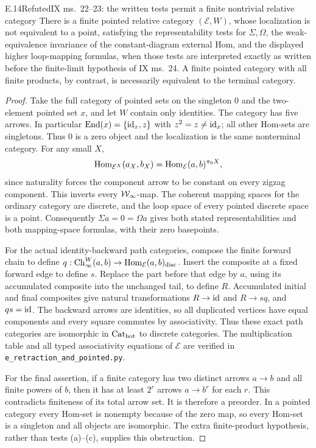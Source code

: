 \begin{claim}{E.14}{Refuted}{IX ms.~22--23: the written tests permit a finite nontrivial relative category}
There is a finite pointed relative category $(\mathcal E,W)$, whose localization is not equivalent to a point, satisfying the representability tests for $\Sigma,\Omega$, the weak-equivalence invariance of the constant-diagram external Hom, and the displayed higher loop-mapping formulas, when those tests are interpreted exactly as written before the finite-limit hypothesis of IX ms.~24. A finite pointed category with all finite products, by contrast, is necessarily equivalent to the terminal category.
\end{claim}
\begin{proof}
Take the full category of pointed sets on the singleton $0$ and the two-element pointed set $x$, and let $W$ contain only identities. The category has five arrows. In particular $\operatorname{End}(x)=\{\mathrm{id}_x,z\}$ with $z^2=z\ne\mathrm{id}_x$; all other Hom-sets are singletons. Thus $0$ is a zero object and the localization is the same nonterminal category. For any small $X$,
\[
 \operatorname{Hom}_{\mathcal E^X}(a_X,b_X)=\operatorname{Hom}_{\mathcal E}(a,b)^{\pi_0X},
\]
since naturality forces the component arrow to be constant on every zigzag component. This inverts every $\mathcal W_\infty$-map. The coherent mapping spaces for the ordinary category are discrete, and the loop space of every pointed discrete space is a point. Consequently $\Sigma a=0=\Omega a$ gives both stated representabilities and both mapping-space formulas, with their zero basepoints.

For the actual identity-backward path categories, compose the finite forward chain to define $q:\mathrm{Ch}^W_\infty(a,b)\to\operatorname{Hom}_{\mathcal E}(a,b)_{\mathrm{disc}}$. Insert the composite at a fixed forward edge to define $s$. Replace the part before that edge by $a$, using its accumulated composite into the unchanged tail, to define $R$. Accumulated initial and final composites give natural transformations $R\to\mathrm{id}$ and $R\to sq$, and $qs=\mathrm{id}$. The backward arrows are identities, so all duplicated vertices have equal components and every square commutes by associativity. Thus these exact path categories are isomorphic in ${\mathrm{Cat}_{\mathrm{hot}}}$ to discrete categories. The multiplication table and all typed associativity equations of $\mathcal E$ are verified in \texttt{e\_retraction\_and\_pointed.py}.

For the final assertion, if a finite category has two distinct arrows $a\to b$ and all finite powers of $b$, then it has at least $2^r$ arrows $a\to b^r$ for each $r$. This contradicts finiteness of its total arrow set. It is therefore a preorder. In a pointed category every Hom-set is nonempty because of the zero map, so every Hom-set is a singleton and all objects are isomorphic. The extra finite-product hypothesis, rather than tests (a)--(c), supplies this obstruction.
\end{proof}

